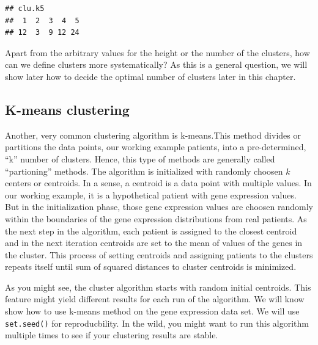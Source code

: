 \documentclass[12pt,]{krantz}
\newenvironment{Shaded}{\begin{snugshade}}{\end{snugshade}}
\newcommand{\CommentTok}[1]{\textcolor[rgb]{0.56,0.35,0.01}{\textit{#1}}}
\newcommand{\DataTypeTok}[1]{\textcolor[rgb]{0.13,0.29,0.53}{#1}}
\newcommand{\DecValTok}[1]{\textcolor[rgb]{0.00,0.00,0.81}{#1}}
\newcommand{\KeywordTok}[1]{\textcolor[rgb]{0.13,0.29,0.53}{\textbf{#1}}}
\newcommand{\NormalTok}[1]{#1}
\newcommand{\OperatorTok}[1]{\textcolor[rgb]{0.81,0.36,0.00}{\textbf{#1}}}
\begin{document}
\begin{verbatim}
## clu.k5
##  1  2  3  4  5 
## 12  3  9 12 24
\end{verbatim}

Apart from the arbitrary values for the height or the number of the clusters, how can we define clusters more systematically? As this is a general question, we will show later how to decide the optimal number of clusters later in this chapter.

\hypertarget{k-means-clustering}{%
\subsection{K-means clustering}\label{k-means-clustering}}

Another, very common clustering algorithm is k-means.This method divides or partitions the data points, our working example patients, into a pre-determined, ``k'' number of clusters. Hence, this type of methods are generally called ``partioning'' methods. The algorithm is initialized with randomly choosen \(k\) centers or centroids. In a sense, a centroid is a data point with multiple values. In our working example, it is a hypothetical patient with gene expression values. But in the initialization phase, those gene expression values are choosen randomly within the boundaries of the gene expression distributions from real patients. As the next step in the algorithm, each patient is assigned to the closest centroid and in the next iteration centroids are set to the mean of values of the genes in the cluster. This process of setting centroids and assigning patients to the clusters repeats itself until sum of squared distances to cluster centroids is minimized.

As you might see, the cluster algorithm starts with random initial centroids. This feature might yield different results for each run of the algorithm. We will know show how to use k-means method on the gene expression data set. We will use \texttt{set.seed()} for reproducbility. In the wild, you might want to run this algorithm multiple times to see if your clustering results are stable.

\begin{Shaded}
\end{Shaded}
\end{document}
